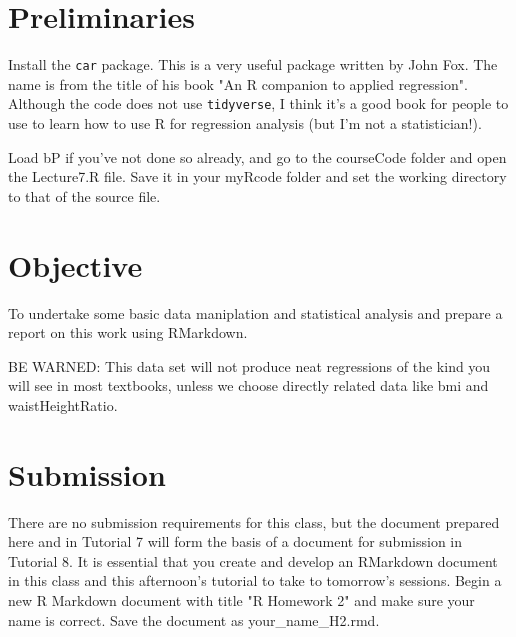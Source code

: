 \documentclass[titlepage]{book}\usepackage{knitr}
\begin{document}
\author{Brian Williams $<$\href{mailto:bjw649@gmail.com}%
{bjw649@gmail.com}$>$}


\section{Preliminaries}
Install the \texttt{car} package. This is a very useful package written by John Fox. The name is from the title of his book "An R companion to applied regression".  Although the code does not use \texttt{tidyverse}, I think it's a good book for people to use to learn how to use R for regression analysis (but I'm not a statistician!).

Load bP if you've not done so already, and go to the courseCode folder and open the Lecture7.R file.  Save it in your myRcode folder and set the working directory to that of the source file.

\begin{knitrout}
\color{fgcolor}\begin{kframe}
\begin{alltt}
\hlstd{(}\hlstd{)}
\end{alltt}
\end{kframe}
\end{knitrout}


\section{Objective} 
To undertake some basic data maniplation and statistical analysis and prepare a report on this work using RMarkdown.  

BE WARNED: This data set will not produce neat regressions of the kind you will see in most textbooks, unless we choose directly related data like bmi and waistHeightRatio.

\section{Submission}

There are no submission requirements for this class, but the document prepared here and in Tutorial 7 will form the basis of a document for submission in Tutorial 8. It is essential that you create and develop an RMarkdown document in this class and this afternoon's tutorial to take to tomorrow's sessions. Begin a new R Markdown document with title "R Homework 2" and make sure your name is correct. Save the document as your\_name\_H2.rmd.
\end{document}
